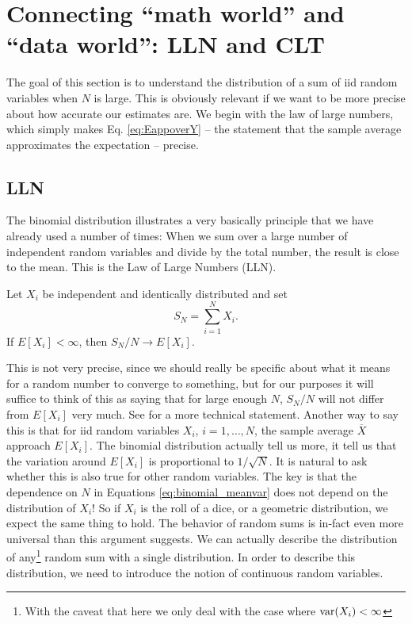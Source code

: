  \section{Connecting ``math world'' and ``data world'': LLN and CLT}\label{sec:llnclt}
 The goal of this section is to understand the distribution of a sum of iid random variables when $N$ is large. This is obviously relevant if we want to be more precise about how accurate our estimates are. We begin with the law of large numbers, which simply makes Eq. \ref{eq:EappoverY} -- the statement that the sample average approximates the expectation -- precise. 
 
 \subsection{LLN}
The binomial distribution illustrates a very basically principle that we have already used a number of times: When we sum over a large number of independent random variables and divide by the total number, the result is close to the mean. This is the Law of Large Numbers (LLN). 
 \begin{thm} Let $X_i$ be independent and identically distributed and set
 \begin{equation*}
 S_N = \sum_{i=1}^N X_i.
 \end{equation*}
 If $E[X_i]<\infty$, then $S_N/N \to E[X_i]$. 
 \end{thm}
 This is not very precise, since we should really be specific about what it means for a random number to converge to something, but for our purposes it will suffice to think of this as saying that for large enough $N$, $S_N/N$ will not differ from $E[X_i]$ very much. See  \cite[Theorem 4.2.1]{evans} for a more technical statement. Another way to say this is that for iid random variables $X_i$, $i=1,\dots,N$, the sample average $\overline{X}$ approach $E[X_i]$. 
The binomial distribution actually tell us more, it tell us that the variation around $E[X_i]$ is proportional to $1/\sqrt{N}$. It is natural to ask whether this is also true for other random variables. The key is that the dependence on $N$ in Equations \ref{eq:binomial_meanvar} does not depend on the distribution of $X_i$! So if $X_i$ is the roll of a dice, or a geometric distribution, we expect the same thing to hold. 
The behavior of random sums is in-fact even more universal than this argument suggests. We can actually describe the distribution of any\footnote{With the caveat that here we only deal with the case where ${\rm var}(X_i)<\infty$} random sum with a single distribution.  In order to describe this distribution, we need to introduce the notion of continuous random variables. 

